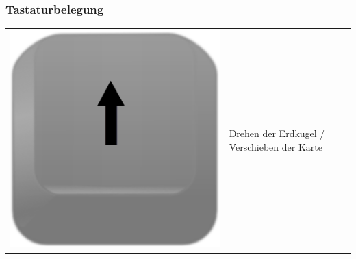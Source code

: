 \documentclass[10pt]{scrreprt}
\begin{document}
\subsubsection*{Tastaturbelegung}
\begin{tabular}{|>{\centering \arraybackslash}m{3cm}|m{10cm}|}
\hline
\rule[-1ex]{0pt}{7ex}\includegraphics[scale=0.08]{images/key_arrow_up.eps}& \multirow{3}{*}{Drehen der Erdkugel / Verschieben der Karte}\\

\end{tabular}
\end{document}
